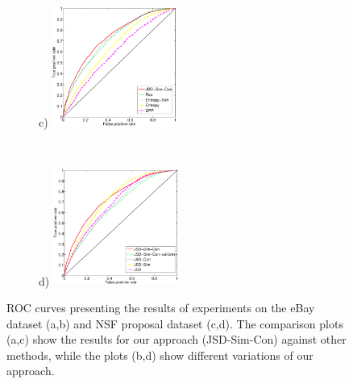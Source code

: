 \begin{figure}[t!]
  \begin{subfigure}
(c) \hspace{-1mm}
    \centering
    \includegraphics[width=0.45\textwidth]{figures/nsf-comparison-new.eps}
\hspace{4mm}
  \end{subfigure}%
  ~
  \begin{subfigure}
(d) \hspace{-1mm}
    \centering
    \includegraphics[width=0.45\textwidth]{figures/nsf-breakdown-new.eps}
  \end{subfigure}

  \caption{ROC curves presenting the results of experiments on
 the eBay dataset (a,b) and NSF proposal dataset (c,d). The
 comparison plots (a,c) show the results for our approach (JSD-Sim-Con)
 against other methods, while the plots (b,d)
 show different variations of our approach. }
\label{fig:roc-curves}
\end{figure}


